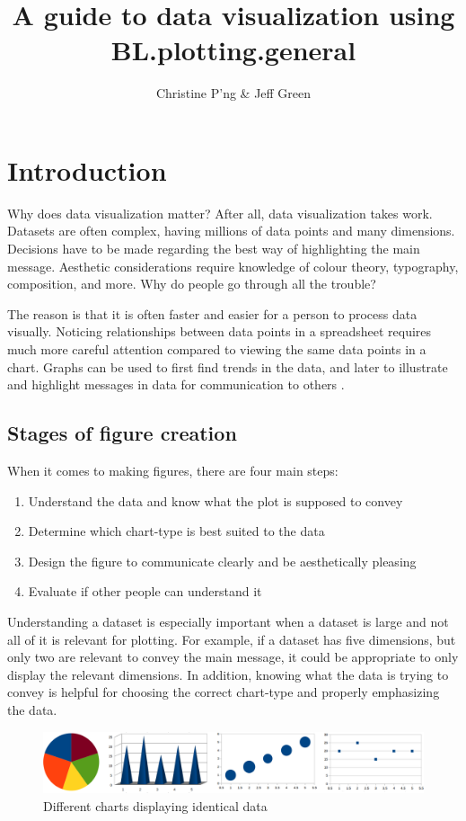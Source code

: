 \documentclass[letterpaper]{report}\usepackage[]{graphicx}\usepackage[]{color}
\title{A guide to data visualization using BL.plotting.general}
\author{Christine P'ng \& Jeff Green}
\begin{document}
\maketitle

\tableofcontents
\newpage
\section{Introduction}
Why does data visualization matter? After all, data visualization takes work. Datasets are often complex, having millions of data points and many dimensions. Decisions have to be made regarding the best way of highlighting the main message. Aesthetic considerations require knowledge of colour theory, typography, composition, and more. Why do people go through all the trouble?

The reason is that it is often faster and easier for a person to process data visually. Noticing relationships between data points in a spreadsheet requires much more careful attention compared to viewing the same data points in a chart. Graphs can be used to first find trends in the data, and later to illustrate and highlight messages in data for communication to others \cite{Anscombe, wong-dataexploration}.

\subsection{Stages of figure creation}
When it comes to making figures, there are four main steps:
\begin{enumerate}
\item Understand the data and know what the plot is supposed to convey
\item Determine which chart-type is best suited to the data
\item Design the figure to communicate clearly and be aesthetically pleasing
\item Evaluate if other people can understand it
\end{enumerate}

Understanding a dataset is especially important when a dataset is large and not all of it is relevant for plotting. For example, if a dataset has five dimensions, but only two are relevant to convey the main message, it could be appropriate to only display the relevant dimensions. In addition, knowing what the data is trying to convey is helpful for choosing the correct chart-type and properly emphasizing the data. 

\begin{figure}[!ht]
  \begin{center}
     \includegraphics[width=160mm]{Figures/intro_plotting_ex.png}
     \caption{Different charts displaying identical data}
  \end{center}
\end{figure}
\end{document}
